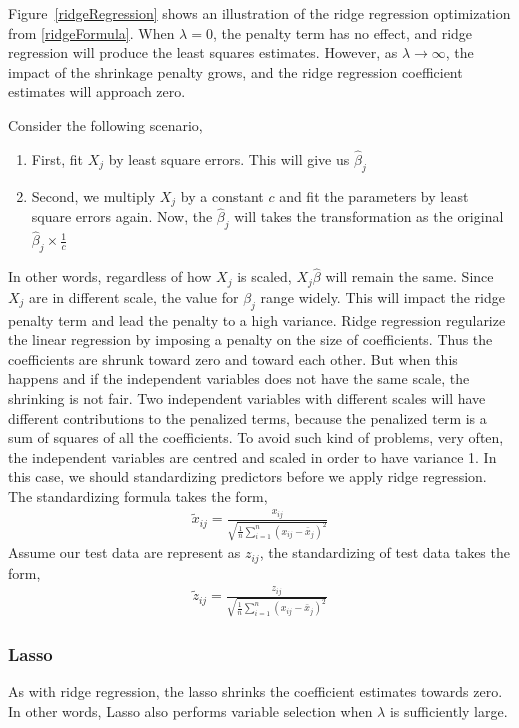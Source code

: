 \documentclass[12pt,a4paper]{article}%
\theoremstyle{definition}
\theoremstyle{plain}
\numberwithin{equation}{section}
\newcounter{subsubsubsection}[subsubsection]
\begin{document}
Figure~\ref{ridgeRegression} shows an illustration of the ridge regression optimization from \eqref{ridgeFormula}. When $\lambda=0$, the penalty term has no effect, and ridge regression will produce the least squares estimates. However, as $\lambda \rightarrow \infty$, the impact of the shrinkage penalty grows, and the ridge regression coefficient estimates will approach zero. 

\subsubsubsection{\textcolor{blue}{Scale equivariant}}
Consider the following scenario,
\begin{enumerate}
\item First, fit $X_{j}$ by least square errors. This will give us $\hat{\beta}_{j}$
\item Second, we multiply $X_{j}$ by a constant $c$ and fit the parameters by least square errors again. Now, the $\hat{\beta}_{j}$ will takes the transformation as the original $\hat{\beta}_{j} \times \frac{1}{c}$
\end{enumerate}

In other words, regardless of how $X_{j}$ is scaled, $X_{j}\hat{\beta}$ will remain the same. Since $X_{j}$ are in different scale, the value for $\beta_{j}$ range widely. 
This will impact the ridge penalty term and lead the penalty to a high variance. Ridge regression regularize the linear regression by imposing a penalty on the size of coefficients. Thus the coefficients are shrunk toward zero and toward each other. But when this happens and if the independent variables does not have the same scale, the shrinking is not fair. Two independent variables with different scales will have different contributions to the penalized terms, because the penalized term is a sum of squares of all the coefficients. To avoid such kind of problems, very often, the independent variables are centred and scaled in order to have variance 1. In this case, we should standardizing predictors before we apply ridge regression. The standardizing formula takes the form,
\begin{gather*}
\tilde{x}_{ij} = \frac{x_{ij}}{\sqrt{\frac{1}{n}\sum\limits^{n}_{i=1} (x_{ij}-\bar{x}_{j})^{2}}}
\end{gather*}
Assume our test data are represent as $z_{ij}$, the standardizing of test data takes the form,
\begin{gather*}
\tilde{z}_{ij} = \frac{z_{ij}}{\sqrt{\frac{1}{n}\sum\limits^{n}_{i=1} (x_{ij}-\bar{x}_{j})^{2}}}
\end{gather*}

\subsubsection{\textbf{Lasso}}
As with ridge regression, the lasso shrinks the coefficient estimates towards zero. In other words, Lasso also performs variable selection when $\lambda$ is sufficiently large. 
\end{document}
